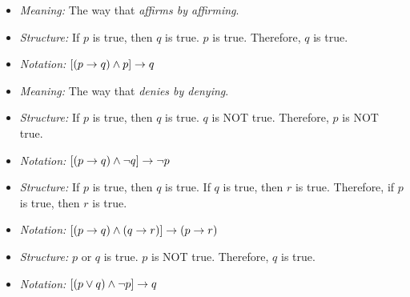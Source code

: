                 \begin{itemize}
                    \item \textit{Meaning:} The way that \textit{affirms by affirming}.
                    \item \textit{Structure:} If $p$ is true, then $q$ is true.
                        $p$ is true. Therefore, $q$ is true.
                    \item \textit{Notation:} $[(p \rightarrow q) \land p] \rightarrow q$
                \end{itemize}
                \begin{itemize}
                    \item \textit{Meaning:} The way that \textit{denies by denying}.
                    \item \textit{Structure:} If $p$ is true, then $q$ is true.
                        $q$ is NOT true. Therefore, $p$ is NOT true.
                    \item \textit{Notation:} $[(p \rightarrow q) \land \lnot q] \rightarrow \lnot p$
                \end{itemize}
        \hiiiEND

                \begin{itemize}
                    \item \textit{Structure:} If $p$ is true, then $q$ is true.
                        If $q$ is true, then $r$ is true.
                        Therefore, if $p$ is true, then $r$ is true.
                    \item \textit{Notation:}
                        $[(p \rightarrow q) \land (q \rightarrow r)] \rightarrow (p \rightarrow r)$
                \end{itemize}
                \begin{itemize}
                    \item \textit{Structure:} $p$ or $q$ is true. $p$ is NOT true.
                        Therefore, $q$ is true.
                    \item \textit{Notation:}
                        $[(p \lor q) \land \lnot p] \rightarrow q$
                \end{itemize}
        \hiiiEND

